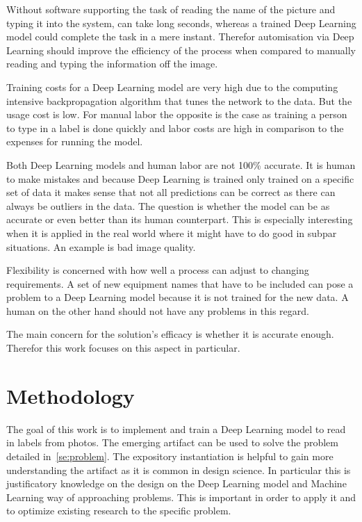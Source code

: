 Without software supporting the task of reading the name of the picture  and typing it into
the system, can take long seconds, whereas a trained Deep Learning model could complete the task
in a mere instant.
Therefor automisation via Deep Learning should improve the efficiency of the process when compared to
manually reading and typing the information off the image.

Training costs for a Deep Learning model are very high due to the computing intensive
backpropagation algorithm that tunes the network to the data.
But the usage cost is low.
For manual labor the opposite is the case as training a person to type in a label is done quickly
and labor costs are high in comparison to the expenses for running the model.

Both Deep Learning models and human labor are not 100\% accurate.
It is human to make mistakes and because Deep Learning is trained only trained on a specific set
of data it makes sense that not all predictions can be correct as there can always be outliers in
the data. %
The question is whether the model can be as accurate or even better than its human counterpart.
This is especially interesting when it is applied in the real world where it might have to do good
in subpar situations.
An example is bad image quality.

Flexibility is concerned with how well a process can adjust to changing requirements.
A set of new equipment names that have to be included can pose a problem to a Deep Learning model
because it is not trained for the new data.
A human on the other hand should not have any problems in this regard.

The main concern for the solution's efficacy is whether it is accurate enough.
Therefor this work focuses on this aspect in particular.

\section{Methodology}

The goal of this work is to implement and train a Deep Learning model to read in labels from photos.
The emerging artifact can be used to solve the problem detailed in~\ref{se:problem}.
The expository instantiation is helpful to gain more understanding the artifact as it is common
in design science.
In particular this is justificatory knowledge on the design on the Deep Learning model and
Machine Learning way of approaching problems.
This is important in order to apply it and to optimize existing research to the specific problem.

